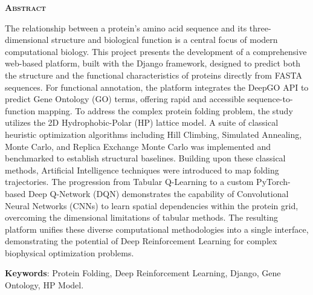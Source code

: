 \vspace*{45pt}
\begin{flushleft}
	{\Large \textbf{\scshape{Abstract}}}
\end{flushleft}
\vspace*{10pt}

The relationship between a protein's amino acid sequence and its three-dimensional structure and biological function is a central focus of modern computational biology. This project presents the development of a comprehensive web-based platform, built with the Django framework, designed to predict both the structure and the functional characteristics of proteins directly from FASTA sequences. For functional annotation, the platform integrates the DeepGO API to predict Gene Ontology (GO) terms, offering rapid and accessible sequence-to-function mapping. To address the complex protein folding problem, the study utilizes the 2D Hydrophobic-Polar (HP) lattice model. A suite of classical heuristic optimization algorithms including Hill Climbing, Simulated Annealing, Monte Carlo, and Replica Exchange Monte Carlo was implemented and benchmarked to establish structural baselines. Building upon these classical methods, Artificial Intelligence techniques were introduced to map folding trajectories. The progression from Tabular Q-Learning to a custom PyTorch-based Deep Q-Network (DQN) demonstrates the capability of Convolutional Neural Networks (CNNs) to learn spatial dependencies within the protein grid, overcoming the dimensional limitations of tabular methods. The resulting platform unifies these diverse computational methodologies into a single interface, demonstrating the potential of Deep Reinforcement Learning for complex biophysical optimization problems.

\vspace*{20pt}

\noindent \textbf{Keywords}:
Protein Folding, Deep Reinforcement Learning, Django, Gene Ontology, HP Model.
